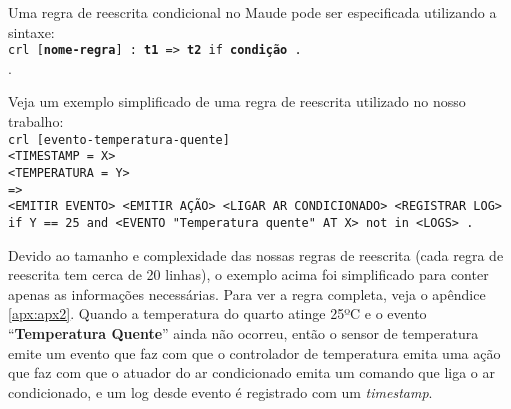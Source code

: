 Uma regra de reescrita condicional no Maude pode ser especificada utilizando a sintaxe: \\
\texttt{crl [\textbf{nome-regra}] : \textbf{t1} => \textbf{t2} if \textbf{condição} . } \\
.

Veja um exemplo simplificado de uma regra de reescrita utilizado no nosso trabalho: \\
\texttt{crl [evento-temperatura-quente]} \\
\texttt{<TIMESTAMP = X>} \\
\texttt{<TEMPERATURA = Y>} \\
\texttt{=>} \\
\texttt{<EMITIR EVENTO> <EMITIR AÇÃO> <LIGAR AR CONDICIONADO> <REGISTRAR LOG>} \\
\texttt{if Y == 25 and <EVENTO "Temperatura quente"\ AT X> not in <LOGS> .}

Devido ao tamanho e complexidade das nossas regras de reescrita (cada regra de reescrita tem cerca de 20 linhas), o exemplo acima foi simplificado para conter apenas as informações necessárias. Para ver a regra completa, veja o apêndice \ref{apx:apx2}. Quando a temperatura do quarto atinge 25ºC e o evento ``\textbf{Temperatura Quente}'' ainda não ocorreu, então o sensor de temperatura emite um evento que faz com que o controlador de temperatura emita uma ação que faz com que o atuador do ar condicionado emita um comando que liga o ar condicionado, e um log desde evento é registrado com um \textit{timestamp}.